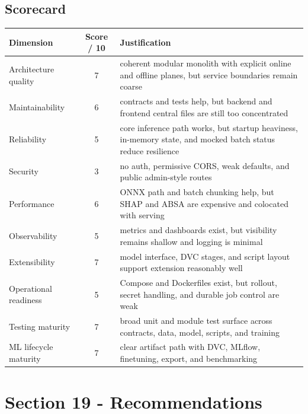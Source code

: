 \subsection{Scorecard}
\begin{table}[H]
\centering
\begin{tabularx}{\textwidth}{@{}l c X@{}}
\toprule
\textbf{Dimension} & \textbf{Score / 10} & \textbf{Justification} \\
\midrule
Architecture quality & 7 & coherent modular monolith with explicit online and offline planes, but service boundaries remain coarse \\
Maintainability & 6 & contracts and tests help, but backend and frontend central files are still too concentrated \\
Reliability & 5 & core inference path works, but startup heaviness, in-memory state, and mocked batch status reduce resilience \\
Security & 3 & no auth, permissive CORS, weak defaults, and public admin-style routes \\
Performance & 6 & ONNX path and batch chunking help, but SHAP and ABSA are expensive and colocated with serving \\
Observability & 5 & metrics and dashboards exist, but visibility remains shallow and logging is minimal \\
Extensibility & 7 & model interface, DVC stages, and script layout support extension reasonably well \\
Operational readiness & 5 & Compose and Dockerfiles exist, but rollout, secret handling, and durable job control are weak \\
Testing maturity & 7 & broad unit and module test surface across contracts, data, model, scripts, and training \\
ML lifecycle maturity & 7 & clear artifact path with DVC, MLflow, finetuning, export, and benchmarking \\
\bottomrule
\end{tabularx}
\end{table}

\section{Section 19 - Recommendations}
